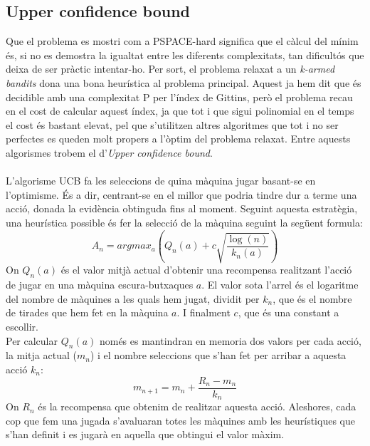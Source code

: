 
\subsection{Upper confidence bound}
Que el problema es mostri com a PSPACE-hard significa que el càlcul del mínim és, si no es demostra la igualtat entre
les diferents complexitats, tan dificultós que deixa de ser pràctic intentar-ho. Per sort, el problema relaxat a un
\textit{k-armed bandits} dona una bona heurística al problema principal. Aquest ja hem dit que és decidible amb una complexitat P
per l'índex de Gittins, però el problema recau en el cost de calcular aquest índex, ja que tot i que sigui polinomial en el temps
el cost és bastant elevat, pel que s'utilitzen altres algoritmes que tot i no ser perfectes es queden molt propers a l'òptim del
problema relaxat. Entre aquests algorismes trobem el d'\textit{Upper confidence bound}. \\
\\
L'algorisme UCB fa les seleccions de quina màquina jugar basant-se en l'optimisme. És a dir, centrant-se en el millor que podria tindre dur a terme una acció, donada la evidència obtinguda fins al moment.
Seguint aquesta estratègia, una heurística possible és fer la selecció de la màquina seguint la següent formula:
\[
A_n = argmax_a(Q_n(a) + c\sqrt{\frac{\log (n)}{k_n(a)}})
\]
On $Q_n(a)$ és el valor mitjà actual d'obtenir una recompensa realitzant l'acció de jugar en una màquina escura-butxaques $a$.
El valor sota l'arrel és el logaritme del nombre de màquines a les quals hem jugat, dividit per $k_n$,
que és el nombre de tirades que hem fet en la màquina $a$. I finalment $c$, que és una constant a escollir.\\
Per calcular $Q_n(a)$ només es mantindran en memoria dos valors per cada acció, la
mitja actual ($m_n$) i el nombre seleccions que s'han fet per arribar a aquesta acció $k_n$: %
\[
m_{n+1} = m_n + \frac{R_n - m_n}{k_n}
\]
On $R_n$ és la recompensa que obtenim de realitzar aquesta acció.
Aleshores, cada cop que fem una jugada s'avaluaran totes les màquines amb les heurístiques que s'han definit i es jugarà en aquella que obtingui el valor màxim.

